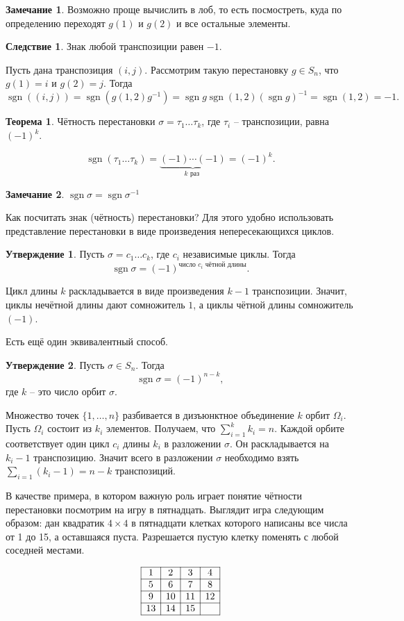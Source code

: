 \documentclass[10pt,a4paper,oneside]{book}
\theoremstyle{definition}
\newtheorem*{rem}{\color{green!50!blue}Замечание}
\newtheorem{thm}{\color{red!40!black}Теорема}
\newtheorem{cor}{\color{green!45!black}Следствие}
\newtheorem{utvr}{\color{blue!50!black}Утверждение}
\newcommand{\sgn}{\operatorname{sgn}}
\def\thrm{\begin{thm}}
\def\ethrm{\end{thm}}
\def\crl{\begin{cor}}
\def\ecrl{\end{cor}}
\def\rm{\begin{rem}}
\def\erm{\end{rem}}
\def\utv{\begin{utvr}}
\def\eutv{\end{utvr}}
\begin{document}
\rm Возможно проще вычислить в лоб, то есть посмостреть, куда по определению переходят $g(1)$ и $g(2)$ и все остальные элементы.
\erm

\crl Знак любой транспозиции равен $-1$.
\ecrl
\proof Пусть дана транспозиция $(i,j)$. Рассмотрим такую перестановку $g\in S_n$, что $g(1)=i$ и $g(2)=j$. Тогда $$\sgn((i,j))=\sgn(g(1,2)g^{-1})=\sgn g \sgn (1,2) (\sgn g)^{-1}=\sgn (1,2)=-1.$$ 
\endproof


\thrm Чётность перестановки $\sigma=\tau_1\dots \tau_k$, где $\tau_i$ -- транспозиции, равна $(-1)^{k}$.
\ethrm
\proof
$$\sgn(\tau_1\dots \tau_k)=\underbrace{(-1)\cdots (-1)}_{k \text{ раз }}=(-1)^k.$$

\endproof

\rm $\sgn \sigma = \sgn \sigma^{-1}$
\erm

Как посчитать знак (чётность) перестановки? Для этого удобно использовать представление перестановки в виде произведения непересекающихся циклов.

\utv Пусть $\sigma=c_1\dots c_k$, где $c_i$ независимые циклы. Тогда
$$\sgn \sigma = (-1)^{\text{число $c_i$ чётной длины}}.$$
\eutv
\proof Цикл длины $k$ раскладывается в виде произведения $k-1$ транспозиции. Значит, циклы нечётной длины дают сомножитель $1$, а циклы чётной длины сомножитель $(-1)$.
\endproof

Есть ещё один эквивалентный способ.
\utv Пусть $\sigma\in S_n$. Тогда
$$\sgn \sigma = (-1)^{n-k},$$
где $k$ -- это число орбит $\sigma$.
\eutv
\proof Множество точек $\{1,\dots,n\}$ разбивается в дизъюнктное объединение  $k$ орбит $\Omega_i$. Пусть $\Omega_i$ состоит из $k_i$ элементов. Получаем, что $\sum_{i=1}^{k} k_i=n$. Каждой орбите соответствует один цикл $c_i$ длины $k_i$ в разложении $\sigma$. Он раскладывается на $k_i-1$ транспозицию. Значит всего в разложении $\sigma$ необходимо взять $\sum_{i=1}(k_i-1)=n-k$ транспозиций. 
\endproof

В качестве примера, в котором важную роль играет понятие чётности перестановки посмотрим на игру в пятнадцать. Выглядит игра следующим образом: дан квадратик $4\times 4$ в пятнадцати клетках которого написаны все числа от 1 до 15, а оставшаяся пуста. Разрешается пустую клетку поменять с любой соседней местами.

$$\begin{array}{|c|c|c|c|}
\hline
1 & 2 & 3 & 4\\
\hline
5 & 6 & 7 & 8\\
\hline
9& 10& 11& 12\\
\hline
13& 14& 15&\\
\hline
\end{array}
$$
\end{document}
